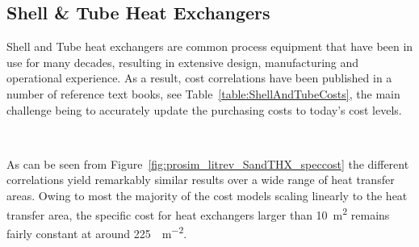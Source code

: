     \subsection{Shell \& Tube Heat Exchangers}

        Shell and Tube heat exchangers are common process equipment that have been in use for many decades, resulting in extensive design, manufacturing and operational experience. As a result, cost correlations have been published in a number of reference text books, see Table~\ref{table:ShellAndTubeCosts}, the main challenge being to accurately update the purchasing costs to today's cost levels.
        
        \begin{table}[H]
            \caption[Cost correlations for shell and tube heat exchangers.]{Cost correlations for shell and tube heat exchangers.\(A\) is the heat transfer area in \unit{\square\m}. \textsuperscript{a}Floating head \textsuperscript{b}Fixed head \textsuperscript{c}Fixed or floating head \textsuperscript{d}Kettle boiler \textsuperscript{e}Primary heat exchanger \textsuperscript{f}Recuperator}
            \centering 
            \label{table:ShellAndTubeCosts}
            \scalebox{0.8}{
                
            }
            \\[10pt]
        \end{table}

        As can be seen from Figure~\ref{fig:prosim_litrev_SandTHX_speccost} the different correlations yield remarkably similar results over a wide range of heat transfer areas. Owing to most the majority of the cost models scaling linearly to the heat transfer area, the specific cost for heat exchangers larger than \qty{10}{\square\m} remains fairly constant at around \qty{225}{\USD\per\square\m}.


